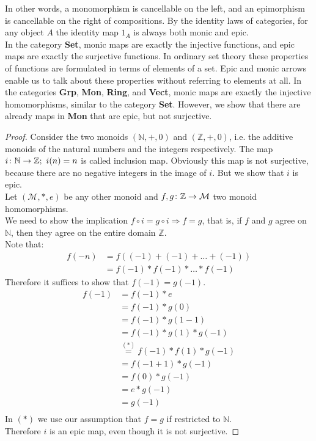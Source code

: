 
In other words, a monomorphism is cancellable on the left, and an epimorphism is cancellable on the right of compositions.
By the identity laws of categories, for any object $A$ the identity map $1_A$ is always both monic and epic.\\
In the category \textbf{Set}, monic maps are exactly the injective functions, and epic maps are exactly the surjective functions.
In ordinary set theory these properties of functions are formulated in terms of elements of a set.
Epic and monic arrows enable us to talk about these properties without referring to elements at all.
In the categories \textbf{Grp}, \textbf{Mon}, \textbf{Ring}, and \textbf{Vect}, monic maps are exactly the injective homomorphisms,
similar to the category \textbf{Set}.
However, we show that there are already maps in \textbf{Mon} that are epic, but not surjective.
\begin{proof}
  Consider the two monoids $(\mathbb{N}, +, 0)$ and $(\mathbb{Z}, +, 0)$, i.e. the
  additive monoids of the natural numbers and the integers respectively.
  The map $i \from \mathbb{N} \to \mathbb{Z}; \ i(n) = n$ is called inclusion map.
  Obviously this map is not surjective, because there are no negative integers
  in the image of $i$. But we show that $i$ is epic.\\
  Let $(\mathcal{M}, *, e)$ be any other monoid and $f, g \from \mathbb{Z} \to \mathcal{M}$ two
  monoid homomorphisms.\\
  We need to show the implication $f \circ i = g \circ i \Rightarrow f = g$, that is,
  if $f$ and $g$ agree on $\mathbb{N}$, then they agree on the entire domain $\mathbb{Z}$.\\
  Note that:
  \begin{align*}
    f(-n) &= f ((-1) + (-1) + \dots + (-1))\\
          &= f (-1) * f(-1) * \dots * f(-1)
  \end{align*}
  Therefore it suffices to show that $f(-1) = g(-1)$.
  \begin{align*}
    f(-1) &= f(-1) * e \\
          &= f(-1) * g(0) \\
          &= f(-1) * g(1 - 1) \\
          &= f(-1) * g(1) * g(-1) \\
          &\overset{(*)}{=} f(-1) * f(1) * g(-1) \\
          &= f(-1 + 1) * g(-1) \\
          &= f(0) * g(-1) \\
          &= e * g(-1) \\
          &= g(-1) \\ 
  \end{align*}
  In $(*)$ we use our assumption that $f=g$ if restricted to $\mathbb{N}$.\\
  Therefore $i$ is an epic map, even though it is not surjective.
\end{proof}

